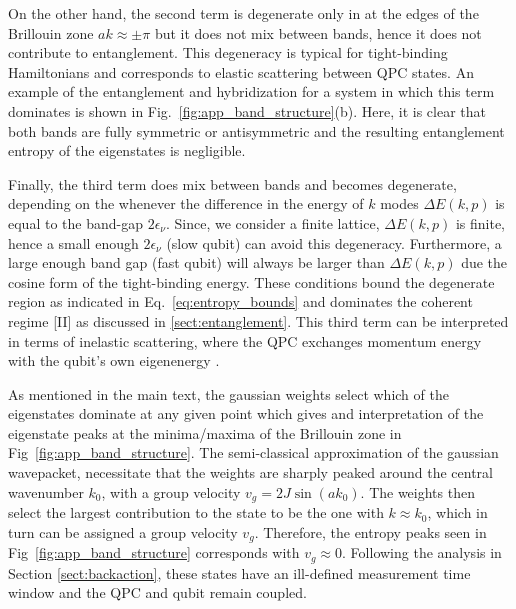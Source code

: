 \documentclass[10pt,
 amsmath,amssymb,
 aps,prb, twocolumn
]{revtex4-2}
\begin{document}
On the other hand, the second term is degenerate only in at the edges of the Brillouin zone \mbox{$a k\approx \pm \pi$} but it does not mix between bands, hence it does not contribute to entanglement. This degeneracy is typical for tight-binding Hamiltonians and corresponds to elastic scattering between QPC states. An example of the entanglement and hybridization for a system in which this term dominates is shown in Fig.~\ref{fig:app_band_structure}(b). Here, it is clear that both bands are fully symmetric or antisymmetric and the resulting entanglement entropy of the eigenstates is negligible.

Finally, the third term does mix between bands and becomes degenerate, depending on the whenever the difference in the energy of \mbox{$k$} modes \mbox{$\Delta E (k,p)$} is equal to the band-gap \mbox{$2\epsilon_\nu$}. Since, we consider a finite lattice, \mbox{$\Delta E (k,p)$} is finite, hence a small enough $2 \epsilon_\nu$ (slow qubit) can avoid this degeneracy. Furthermore, a large enough band gap (fast qubit) will always be larger than \mbox{$\Delta E (k,p)$} due the cosine form of the tight-binding energy. These conditions bound the degenerate region as indicated in Eq.~\eqref{eq:entropy_bounds} and dominates the coherent regime [II] as discussed in \ref{sect:entanglement}. This third term can be interpreted in terms of inelastic scattering, where the QPC exchanges momentum energy with the qubit's own eigenenergy .

As mentioned in the main text, the gaussian weights select which of the eigenstates dominate at any given point which gives and interpretation of the eigenstate peaks at the minima/maxima of the Brillouin zone in Fig~\ref{fig:app_band_structure}. The semi-classical approximation of the gaussian wavepacket, necessitate that the weights are sharply peaked around the central wavenumber $k_0$, with a group velocity $v_g = 2 J \sin{(ak_0)}$. The weights then select the largest contribution to the state to be the one with $k \approx k_0$, which in turn can be assigned a group velocity $v_g$. Therefore, the entropy peaks seen in Fig~\ref{fig:app_band_structure} corresponds with $v_g \approx 0$. Following the analysis in Section \ref{sect:backaction}, these states have an ill-defined measurement time window and the QPC and qubit remain coupled. 

\twocolumngrid
\end{document}
